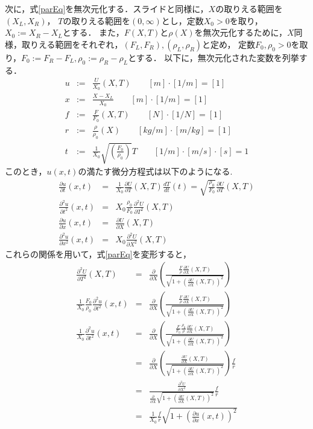 \documentclass{jarticle}
\begin{document}
次に，式\ref{parEq}を無次元化する．スライドと同様に，$X$の取りえる範囲を$\left( X_L, X_R \right)$，
$T$の取りえる範囲を$\left( 0, \infty \right)$とし，定数$X_{0} > 0$を取り，$X_0 := X_R - X_L$とする．
また，$F(X, T)と\rho(X)$を無次元化するために，$X$同様，取りえる範囲をそれぞれ，$(F_L, F_R),(\rho_L, \rho_R)$と定め，
定数$F_0, \rho_0 > 0$を取り，$F_0 := F_R - F_L, \rho_0 := \rho_R - \rho_L$とする．
以下に，無次元化された変数を列挙する．
\begin{eqnarray*}
  u &:=& \frac{U}{X_0}(X, T) \qquad [m]\cdot[1/m] = [1] \\
  x &:=& \frac{X - X_L}{X_0} \qquad [m]\cdot[1/m]  = [1] \\
  f &:=& \frac{F}{F_0}(X, T) \qquad [N]\cdot[1/N]  = [1] \\
  r &:=& \frac{\rho}{\rho_0}(X) \qquad [kg/m]\cdot[m/kg] = [1] \\
  t &:=& \frac{1}{X_0}\sqrt{\left( \frac{F_0}{\rho_0} \right)} T \qquad [1/m]\cdot[m/s]\cdot[s] = 1 
\end{eqnarray*}
このとき，$u(x,t)$の満たす微分方程式は以下のようになる.
\begin{eqnarray*}
  \frac{\partial u}{\partial t}(x,t) &=& \frac{1}{X_0} \frac{\partial U}{\partial T}(X,T) \frac{dT}{dt}(t) = \sqrt{\frac{\rho_0}{F_0}} \frac{\partial U}{\partial T}(X,T) \\
  \frac{\partial^2 u}{\partial t^2}(x,t) &=& X_0 \frac{\rho_0}{F_0} \frac{\partial^2 U}{\partial T^2}(X,T) \\
  \frac{\partial u}{\partial x}(x,t) &=& \frac{\partial U}{\partial X}(X,T) \\
  \frac{\partial^2 u}{\partial x^2}(x,t) &=& X_0 \frac{\partial^2 U}{\partial X^2}(X,T)
\end{eqnarray*}
これらの関係を用いて，式\ref{parEq}を変形すると，
\begin{eqnarray*}
  \frac{ \partial^2 U }{ \partial T^2 }(X,T) &=& \frac{\partial}{\partial X} \left( \frac{ \frac{F}{\rho} \frac{\partial U}{\partial X}(X,T) }{\sqrt{1 + \left( \frac{\partial U}{\partial X}(X,T) \right)^2 }} \right) \\
  \frac{1}{X_0} \frac{F_0}{\rho_0} \frac{\partial^2 u}{\partial t^2}(x,t) &=& \frac{\partial}{\partial X} \left( \frac{ \frac{F}{\rho} \frac{\partial U}{\partial X}(X,T) }{\sqrt{1 + \left( \frac{\partial U}{\partial X}(X,T) \right)^2 }} \right) \\
  \frac{1}{X_0} \frac{\partial^2 u}{\partial t^2}(x,t) &=& \frac{\partial}{\partial X} \left( \frac{ \frac{F}{F_0}\frac{\rho_0}{\rho}\frac{\partial U}{\partial X}(X,T) }{\sqrt{1 + \left( \frac{\partial U}{\partial X}(X,T) \right)^2 }} \right) \\
  &=& \frac{\partial}{\partial X} \left( \frac{ \frac{\partial U}{\partial X}(X,T) }{\sqrt{1 + \left( \frac{\partial U}{\partial X}(X,T) \right)^2 }} \right) \frac{f}{r} \\
  &=& \frac{ \frac{\partial^2 U}{\partial X^2} }{ \frac{\partial}{\partial X} \sqrt{1 + \left( \frac{\partial U}{\partial X}(X,T) \right)^2 } } \frac{f}{r} \\
  &=& \frac{1}{X_0} \frac{f}{r} \sqrt{1 + \left( \frac{\partial u}{\partial x}(x,t) \right)^2}
\end{eqnarray*} 
\end{document}
